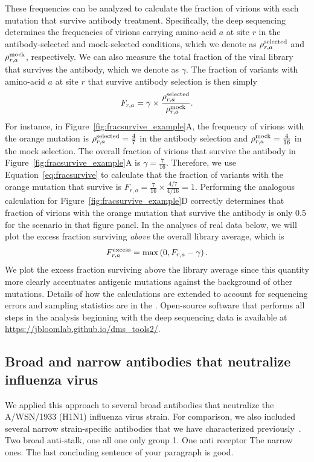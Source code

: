 \documentclass[11pt]{article}
\begin{document}
These frequencies can be analyzed to calculate the fraction of virions with each mutation that survive antibody treatment.
Specifically, the deep sequencing determines the frequencies of virions carrying amino-acid $a$ at site $r$ in the antibody-selected and mock-selected conditions, which we denote as $\rho_{r,a}^{\rm{selected}}$ and $\rho_{r,a}^{\rm{mock}}$, respectively.
We can also measure the total fraction of the viral library that survives the antibody, which we denote as $\gamma$.
The fraction of variants with amino-acid $a$ at site $r$ that survive antibody selection is then simply 
\begin{equation}
\label{eq:fracsurvive}
F_{r,a} = \gamma \times \frac{\rho_{r,a}^{\rm{selected}}}{\rho_{r,a}^{\rm{mock}}}.
\end{equation}
For instance, in Figure~\ref{fig:fracsurvive_example}A, the frequency of virions with the orange mutation is $\rho_{r,a}^{\rm{selected}} = \frac{4}{7}$ in the antibody selection and $\rho_{r,a}^{\rm{mock}} = \frac{4}{16}$ in the mock selection.
The overall fraction of virions that survive the antibody in Figure~\ref{fig:fracsurvive_example}A is $\gamma = \frac{7}{16}$.
Therefore, we use Equation~\ref{eq:fracsurvive} to calculate that the fraction of variants with the orange mutation that survive is $F_{r,a} = \frac{7}{16} \times \frac{4/7}{4/16} = 1$.
Performing the analogous calculation for Figure~\ref{fig:fracsurvive_example}D correctly determines that fraction of virions with the orange mutation that survive the antibody is only 0.5 for the scenario in that figure panel.
In the analyses of real data below, we will plot the excess fraction surviving \emph{above} the overall library average, which is
\begin{equation}
\label{eq:fracsurvive_excess}
F_{r,a}^{\rm{excess}} = \max\left(0, F_{r,a} - \gamma\right).
\end{equation}
We plot the excess fraction surviving above the library average since this quantity more clearly accentuates antigenic mutations against the background of other mutations.
Details of how the calculations are extended to account for sequencing errors and sampling statistics are in the .
Open-source software that performs all steps in the analysis beginning with the deep sequencing data is available at \url{https://jbloomlab.github.io/dms_tools2/}.

\subsection*{Broad and narrow antibodies that neutralize influenza virus}
We applied this approach to several broad antibodies that neutralize the A/WSN/1933 (H1N1) influenza virus strain.
For comparison, we also included several narrow strain-specific antibodies that we have characterized previously~\cite{doud2017complete}.
Two broad anti-stalk, one all one only group 1.
One anti receptor
The narrow ones.
The last concluding sentence of your paragraph is good.
\end{document}
